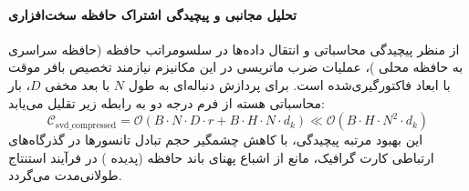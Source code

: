 \paragraph{تحلیل مجانبی و پیچیدگی اشتراک حافظه سخت‌افزاری}
از منظر پیچیدگی محاسباتی و انتقال داده‌ها در سلسومراتب حافظه (حافظه سراسری  به حافظه محلی )، عملیات ضرب ماتریسی در این مکانیزم نیازمند تخصیص بافر موقت با ابعاد فاکتورگیری‌شده است. برای پردازش دنباله‌ای به طول $N$ با بعد مخفی $D$، بار محاسباتی هسته از فرم درجه دو به رابطه زیر تقلیل می‌یابد:
\begin{equation}
\label{eq:complexity_svd_compressed}
\mathcal{C}_{\text{svd\_compressed}} = \mathcal{O}\left( B \cdot N \cdot D \cdot r + B \cdot H \cdot N \cdot d_k \right) \ll \mathcal{O}\left( B \cdot H \cdot N^2 \cdot d_k \right)
\end{equation}
این بهبود مرتبه پیچیدگی، با کاهش چشمگیر حجم تبادل تانسورها در گذرگاه‌های ارتباطی کارت گرافیک، مانع از اشباع پهنای باند حافظه (پدیده ) در فرآیند استنتاج طولانی‌مدت می‌گردد.